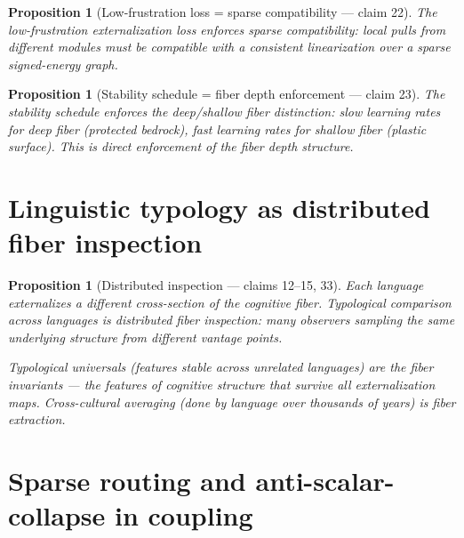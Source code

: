 \documentclass[11pt,a4paper]{article}
\newtheorem{proposition}[definition]{Proposition}
\begin{document}
\begin{proposition}[Low-frustration loss = sparse compatibility --- claim 22]
\label{prop:frustration}
The low-frustration externalization loss enforces sparse compatibility:
local pulls from different modules must be compatible with a consistent
linearization over a sparse signed-energy graph.
\end{proposition}

\begin{proposition}[Stability schedule = fiber depth enforcement --- claim 23]
\label{prop:stability}
The stability schedule enforces the deep/shallow fiber distinction: slow
learning rates for deep fiber (protected bedrock), fast learning rates
for shallow fiber (plastic surface). This is direct enforcement of the
fiber depth structure.
\end{proposition}

\section{Linguistic typology as distributed fiber inspection}

\begin{proposition}[Distributed inspection --- claims 12--15, 33]
\label{prop:typology}
Each language externalizes a different cross-section of the cognitive
fiber. Typological comparison across languages is distributed fiber
inspection: many observers sampling the same underlying structure from
different vantage points.

Typological universals (features stable across unrelated languages) are
the fiber invariants --- the features of cognitive structure that survive
all externalization maps. Cross-cultural averaging (done by language
over thousands of years) is fiber extraction.
\end{proposition}


\section{Sparse routing and anti-scalar-collapse in coupling}
\label{sec:sparse}
\end{document}
